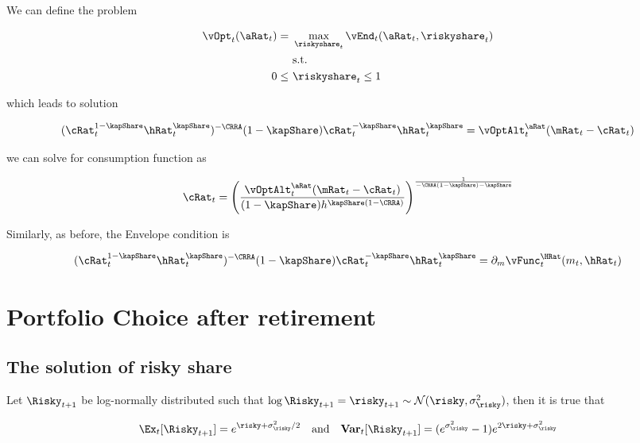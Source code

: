 \documentclass[PortfolioChoiceWithRiskyHousing]{subfiles}
\begin{document}
We can define the problem

\begin{equation}
	\begin{split}
		\vOpt_{t}({\aRat}_{t}) = &~ \max_{\riskyshare_{t}} \vEnd_{t}({\aRat}_{t},\riskyshare_{t}) \\
		&~ \text{s.t.} \\
		0 \leq &~ \riskyshare_{t} \leq 1
	\end{split}
\end{equation}

which leads to solution

\begin{equation}
	(\cRat_{t}^{1-\kapShare} \hRat_{t}^\kapShare)^{-\CRRA} (1-\kapShare) \cRat_{t}^{-\kapShare} \hRat_{t}^\kapShare = \vOptAlt_{t}^{{\aRat}}({\mRat}_{t}-{\cRat}_{t})
\end{equation}

we can solve for consumption function as

\begin{equation}
	\cRat_{t} = \left(\frac{\vOptAlt_{t}^{{\aRat}}({\mRat}_{t}-{\cRat}_{t})}{(1-\kapShare) h^{\kapShare(1-\CRRA)}} \right)^\frac{1}{-\CRRA(1-\kapShare) - \kapShare}
\end{equation}

Similarly, as before, the Envelope condition is

\begin{equation}
	(\cRat_{t}^{1-\kapShare} \hRat_{t}^\kapShare)^{-\CRRA} (1-\kapShare) \cRat_{t}^{-\kapShare} \hRat_{t}^\kapShare = \partial_m \vFunc_{t}^{\HRat}(m_{t}, \hRat_{t})
\end{equation}

\section{Portfolio Choice after retirement}

\subsection{The solution of risky share}

Let $\Risky_{t+1}$ be log-normally distributed such that $\log \Risky_{t+1} = \risky_{t+1} \sim \mathcal{N}(\risky, \sigma_\risky^2)$, then it is true that

\begin{equation}
	\Ex_{t} [\Risky_{t+1}] = e^{\risky + \sigma_\risky^2/2} \quad \text{and} \quad \textbf{Var}_{t} [\Risky_{t+1}] = (e^{\sigma_\risky^2} - 1)e^{2\risky + \sigma_\risky^2}
\end{equation}
\end{document}
